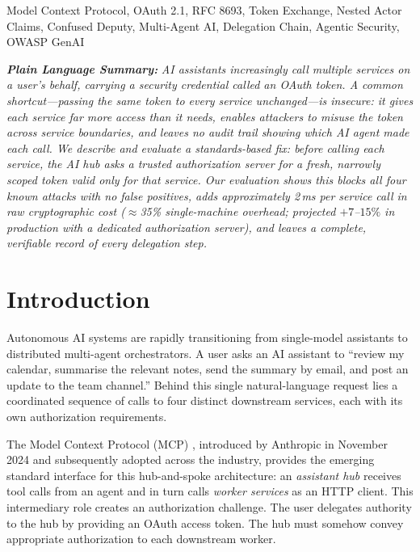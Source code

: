\documentclass[journal]{IEEEtran}
\begin{document}
\begin{IEEEkeywords}
Model Context Protocol, OAuth 2.1, RFC 8693, Token Exchange, Nested Actor Claims,
Confused Deputy, Multi-Agent AI, Delegation Chain, Agentic Security, OWASP GenAI
\end{IEEEkeywords}

\vspace{4pt}
\noindent\textit{\textbf{Plain Language Summary:}}
\textit{AI assistants increasingly call multiple services on a user's behalf,
carrying a security credential called an OAuth token. A common
shortcut---passing the same token to every service unchanged---is insecure: it
gives each service far more access than it needs, enables attackers to misuse the
token across service boundaries, and leaves no audit trail showing which AI agent
made each call. We describe and evaluate a standards-based fix: before calling
each service, the AI hub asks a trusted authorization server for a fresh,
narrowly scoped token valid only for that service. Our evaluation shows this
blocks all four known attacks with no false positives, adds approximately 2\,ms
per service call in raw cryptographic cost ($\approx$35\% single-machine overhead;
projected $+7$--$15\%$ in production with a dedicated authorization server),
and leaves a complete, verifiable record of every delegation step.}

\section{Introduction}
\label{sec:introduction}

Autonomous AI systems are rapidly transitioning from single-model assistants to
distributed multi-agent orchestrators. A user asks an AI assistant to
``review my calendar, summarise the relevant notes, send the summary by email, and
post an update to the team channel.'' Behind this single natural-language request
lies a coordinated sequence of calls to four distinct downstream services, each
with its own authorization requirements.

The Model Context Protocol (MCP) \cite{mcp_spec,mcp_wiki}, introduced by Anthropic in
November 2024 and subsequently adopted across the industry, provides the emerging
standard interface for this hub-and-spoke architecture: an \textit{assistant hub}
receives tool calls from an agent and in turn calls \textit{worker services} as
an HTTP client. This intermediary role creates an authorization challenge. The
user delegates authority to the hub by providing an OAuth access token. The hub
must somehow convey appropriate authorization to each downstream worker.
\end{document}
